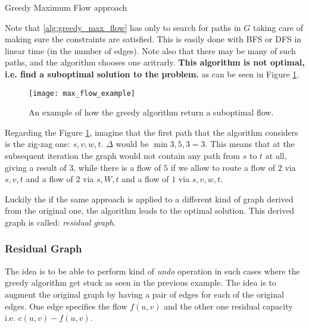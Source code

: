 \begin{algorithm}[H]
	
	\caption{Greedy Maximum Flow approach}
	\label{alg:greedy_max_flow}
\end{algorithm}
Note that \ref{alg:greedy_max_flow} has only to search for paths in $G$ taking care of making sure the constraints are satisfied. This is easily done with BFS or DFS in linear time (in the number of edges). Note also that there may be many of such paths, and the algorithm chooses one aritrarly.
\textbf{This algorithm is not optimal, i.e. find a suboptimal solution to the problem.} as can be seen in Figure \ref{fig:max_flow}.
\begin{figure}
	\label{fig:max_flow}
	\centering
	\texttt{[image: max\_flow\_example]}
	\caption{An example of how the greedy algorithm return a suboptimal flow.}
\end{figure}
Regarding the Figure \ref{fig:max_flow}, imagine that the first path that the algorithm considers is the zig-zag one: $s,v,w,t$. $\Delta$ would be $\min{3,5,3}=3$. This means that at the subsequent iteration the graph would not contain any path from $s$ to $t$ at all, giving a result of $3$, while there is a flow of $5$ if we allow to route a flow of $2$ via $s,v,t$ and a flow of $2$ via $s,W,t$ and a flow of $1$ via $s,v,w,t$.

Luckily the if the same approach is applied to a different kind of graph derived from the original one, the algorithm leads to the optimal solution. This derived graph is called: \textit{residual graph}.

\subsubsection{Residual Graph}
The idea is to be able to perform kind of \textit{undo} operation in such cases where the greedy algorithm get stuck as seen in the previous example.
The idea is to augment the original graph by having a pair of edges for each of the original edges. One edge specifies the flow $f(u,v)$ and the other one residual capacity i.e. $c(u,v) - f(u,v)$.



